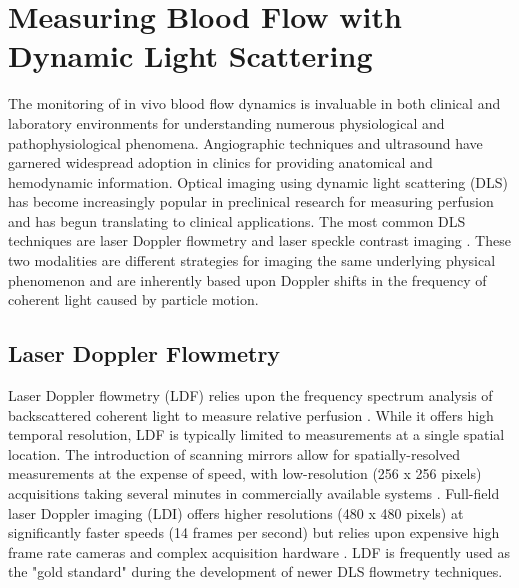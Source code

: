 \section{Measuring Blood Flow with Dynamic Light Scattering}

The monitoring of in vivo blood flow dynamics is invaluable in both clinical and laboratory environments for understanding numerous physiological and pathophysiological phenomena. Angiographic techniques and ultrasound have garnered widespread adoption in clinics for providing anatomical and hemodynamic information. Optical imaging using dynamic light scattering (DLS) has become increasingly popular in preclinical research for measuring perfusion and has begun translating to clinical applications. The most common DLS techniques are laser Doppler flowmetry and laser speckle contrast imaging \cite{Briers:2001hy, Dunn:2011gi}. These two modalities are different strategies for imaging the same underlying physical phenomenon and are inherently based upon Doppler shifts in the frequency of coherent light caused by particle motion.

\subsection{Laser Doppler Flowmetry}

Laser Doppler flowmetry (LDF) relies upon the frequency spectrum analysis of backscattered coherent light to measure relative perfusion \cite{Briers:2001hy}. While it offers high temporal resolution, LDF is typically limited to measurements at a single spatial location. The introduction of scanning mirrors allow for spatially-resolved measurements at the expense of speed, with low-resolution (256 x 256 pixels) acquisitions taking several minutes in commercially available systems \cite{Rajan:2008di}. Full-field laser Doppler imaging (LDI) offers higher resolutions (480 x 480 pixels) at significantly faster speeds (14 frames per second) but relies upon expensive high frame rate cameras and complex acquisition hardware \cite{Lopez:2011bk}. LDF is frequently used as the "gold standard" during the development of newer DLS flowmetry techniques.

